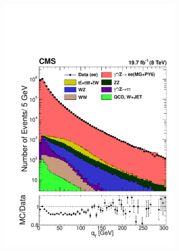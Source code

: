 \begin{figure}
    \centering
    \begin{subfigure}[b]{0.49\textwidth}
    \includegraphics[width=\linewidth]{figures/Results/MADGRAPHqt.pdf}
    \end{subfigure}
    \begin{subfigure}[b]{0.49\textwidth}

\end{subfigure}
\end{figure}
